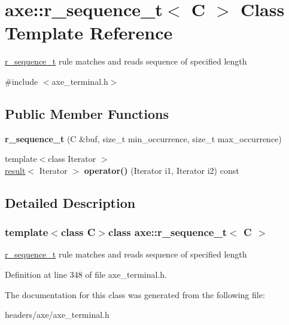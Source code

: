 \hypertarget{classaxe_1_1r__sequence__t}{\section{axe\+:\+:r\+\_\+sequence\+\_\+t$<$ C $>$ Class Template Reference}
\label{classaxe_1_1r__sequence__t}
}


\hyperlink{classaxe_1_1r__sequence__t}{r\+\_\+sequence\+\_\+t} rule matches and reads sequence of specified length  




{\ttfamily \#include $<$axe\+\_\+terminal.\+h$>$}

\subsection*{Public Member Functions}
\begin{DoxyCompactItemize}
\item 
\hypertarget{classaxe_1_1r__sequence__t_abc2ccf4ed935ff6221d9ac5c6fb93dc5}{{\bfseries r\+\_\+sequence\+\_\+t} (C \&buf, size\+\_\+t min\+\_\+occurrence, size\+\_\+t max\+\_\+occurrence)}\label{classaxe_1_1r__sequence__t_abc2ccf4ed935ff6221d9ac5c6fb93dc5}

\item 
\hypertarget{classaxe_1_1r__sequence__t_a61882d1022fc878d013bab16d8ceff83}{{\footnotesize template$<$class Iterator $>$ }\\\hyperlink{structaxe_1_1result}{result}$<$ Iterator $>$ {\bfseries operator()} (Iterator i1, Iterator i2) const }\label{classaxe_1_1r__sequence__t_a61882d1022fc878d013bab16d8ceff83}

\end{DoxyCompactItemize}


\subsection{Detailed Description}
\subsubsection*{template$<$class C$>$class axe\+::r\+\_\+sequence\+\_\+t$<$ C $>$}

\hyperlink{classaxe_1_1r__sequence__t}{r\+\_\+sequence\+\_\+t} rule matches and reads sequence of specified length 

Definition at line 348 of file axe\+\_\+terminal.\+h.



The documentation for this class was generated from the following file\+:\begin{DoxyCompactItemize}
\item 
headers/axe/axe\+\_\+terminal.\+h\end{DoxyCompactItemize}
